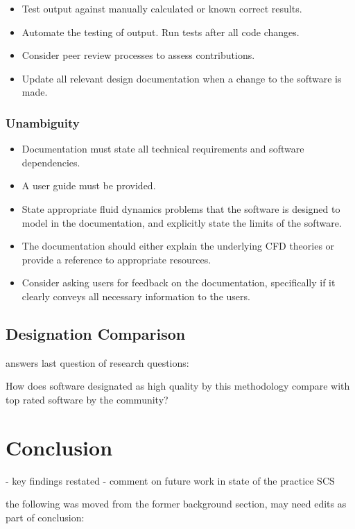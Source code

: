 \documentclass[12pt, notitlepage]{article}
\begin{document}
\begin{itemize}
	\item Test output against manually calculated or known correct results.
	\item Automate the testing of output. Run tests after all code changes.
	\item Consider peer review processes to assess contributions. 
	\item Update all relevant design documentation when a change to the software is made.
\end{itemize}

\subsubsection{Unambiguity}

\begin{itemize}
	\item Documentation must state all technical requirements and software dependencies. 
	\item A user guide must be provided.
	\item State appropriate fluid dynamics problems that the software is designed to model in the documentation, and explicitly state the limits of the software. 
	\item The documentation should either explain the underlying CFD theories or provide a reference to appropriate resources.
	\item Consider asking users for feedback on the documentation, specifically if it clearly conveys all necessary information to the users.
\end{itemize}


\subsection{Designation Comparison}

answers last question of research questions:

How does software designated as high quality by this methodology compare	with top rated software by the community?


\newpage
\section{Conclusion}

- key findings restated
- comment on future work in state of the practice SCS

the following was moved from the former background section, may need edits as part of conclusion:
\end{document}
